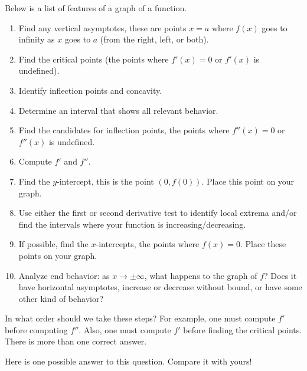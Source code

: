 \documentclass{ximera}
\begin{document}
\begin{problem}%
  Below is a list of features of a graph of a function.
  \begin{enumerate}
  \item Find any vertical asymptotes, these are points $x=a$ where
    $f(x)$ goes to infinity as $x$ goes to $a$ (from the right, left,
    or both).    
  \item Find the critical points (the points where $f'(x) = 0$ or
    $f'(x)$ is undefined).
  \item Identify inflection points and concavity.
  \item Determine an interval that shows all relevant behavior.
  \item Find the candidates for inflection points, the points where
    $f''(x) = 0$ or $f''(x)$ is undefined.
  \item Compute $f'$ and $f''$.
  \item Find the $y$-intercept, this is the point $(0,f(0))$. Place this
    point on your graph.
  \item Use either the first or second derivative test to identify local extrema and/or
    find the intervals where your function is increasing/decreasing.
  \item If possible, find the $x$-intercepts, the points where $f(x) =
    0$. Place these points on your graph.
  \item Analyze end behavior:  as $x \to \pm \infty$, what happens to the graph of $f$?  Does it  have horizontal asymptotes, increase or decrease without bound, or have some other kind of behavior?
 \end{enumerate}
  In what order should we take these steps? For example, one must compute
   $f'$ before computing $f''$. Also, one must compute $f'$ before 
   finding the critical points. There is more than one correct answer.
  \begin{freeResponse}
  Here is one possible answer to this question.  Compare it with yours!
\end{freeResponse}
\end{problem}
\end{document}
